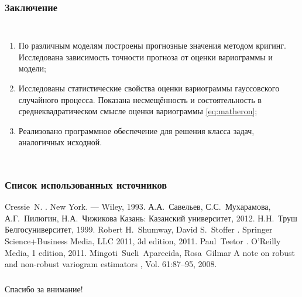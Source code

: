 \documentclass[notheorems]{beamer}
\theoremstyle{definition}
\theoremstyle{example}
\theoremstyle{plain}
\begin{document}
\begin{frame}
  \frametitle{Заключение}
  \setlength{\itemindent}{-.5in}
  \begin{columns}
  \vspace{-9pt}
  \begin{enumerate}
    \item[3.] По различным моделям построены прогнозные значения методом кригинг. Исследована зависимость точности прогноза от оценки вариограммы и модели;
    \item[4.] Исследованы статистические свойства оценки вариограммы гауссовского случайного процесса. Показана несмещённость и состоятельность в среднеквадратическом смысле оценки вариограммы \eqref{eq:matheron};
    \item[5.] Реализовано программное обеспечение для решения класса задач, аналогичных исходной.
  \end{enumerate}
  \end{columns}
\end{frame}

\begin{frame}
  \frametitle{Список использованных источников}
  \begin{scriptsize}
  \begin{thebibliography}{5}
    \beamertemplatebookbibitems
      Cressie~N.
      .
      \newblock New York. --- Wiley, 1993.
    \beamertemplatebookbibitems
      А.А.~Савельев, С.С.~Мухарамова, А.Г.~Пилюгин, Н.А.~Чижикова
      \newblock Казань: Казанский университет, 2012.
    \beamertemplatebookbibitems
      Н.Н.~Труш
      \newblock Белгосуниверситет, 1999.
    \beamertemplatebookbibitems
      Robert H.~Shumway, David S.~Stoffer
      .
      \newblock Springer Science+Business Media, LLC 2011, 3d edition, 2011.
    \beamertemplatebookbibitems
      Paul~Teetor
      .
      \newblock O’Reilly Media, 1 edition, 2011.
    \beamertemplatearticlebibitems
      Mingoti~Sueli~Aparecida, Rosa~Gilmar
      \newblock A note on robust and non-robust variogram estimators
      , Vol. 61:87–95, 2008.
  \end{thebibliography}
\end{scriptsize}
\end{frame}

\begin{frame}
  \frametitle{\null}
  \begin{center}
    {\Huge Спасибо за внимание!}
  \end{center}
\end{frame}
\end{document}
